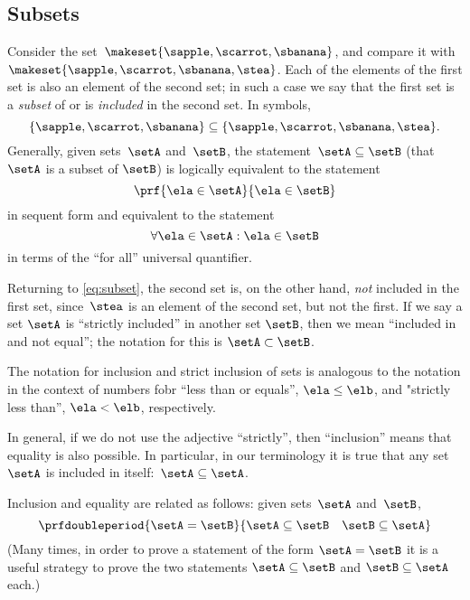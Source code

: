 \subsection{Subsets}

Consider the set~$\makeset{ \sapple, \scarrot, \sbanana }$, and compare it with~$\makeset{ \sapple, \scarrot, \sbanana, \stea }$.
Each of the elements of the first set is also an element of the second set;
in such a case we say that the first set is a \emph{subset} of or is \emph{included} in the second set.
In symbols,
%
\begin{equation}
    \label{eq:subset}
    \{ \sapple, \scarrot, \sbanana \} \subseteq \{ \sapple, \scarrot, \sbanana, \stea \}.
\end{equation}
%
Generally, given sets~$\setA$ and~$\setB$, the statement~$\setA \subseteq \setB$ (that $\setA$ is a subset of $\setB$) is logically equivalent to the statement
%
\begin{equation}
    \prf{
        \ela \in \setA
    }{
        \ela \in \setB
    }
\end{equation}
in sequent form and equivalent to the statement
\begin{equation}\label{eq:inclusion-via-quantifier}
    \forall \ela \in \setA : \ela \in \setB
\end{equation}
in terms of the ``for all'' universal quantifier.

Returning to \cref{eq:subset}, the second set is, on the other hand, \emph{not} included in the first set, since~$\stea$ is an element of the second set, but not the first.
If we say a set $\setA$ is ``strictly included'' in another set $\setB$, then we mean ``included in and not equal''; the notation for this is $\setA \subset \setB$.

The notation for inclusion and strict inclusion of sets is analogous to the notation in the context of numbers fobr ``less than or equals'', $\ela \leq \elb$,  and "strictly less than'', $\ela < \elb$, respectively.

In general, if we do not use the adjective ``strictly'', then ``inclusion'' means that equality is also possible.
In particular, in our terminology it is true that any set~$\setA$ is included in itself:~$\setA \subseteq \setA$.

Inclusion and equality are related as follows: given sets~$\setA$ and~$\setB$,
%
\begin{equation*}
    \prfdoubleperiod{
        \setA = \setB
    }{
        {\setA \subseteq \setB}
        \quad
        {\setB \subseteq \setA}
    }
\end{equation*}
%
(Many times, in order to prove a statement of the form $\setA = \setB$ it is a useful strategy to prove the two statements $\setA \subseteq \setB$ and $\setB \subseteq \setA$ each.)

